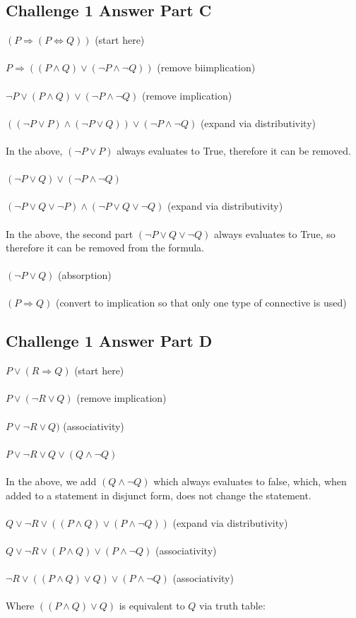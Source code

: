 \documentclass[12pt]{article}
\newcommand{\impl}{\mathbin{\Rightarrow}}
\newcommand{\biim}{\mathbin{\Leftrightarrow}}
\newcommand\tab[1][1cm]{\hspace*{#1}}
\begin{document}
\subsection*{Challenge 1 Answer Part C}
$(P \impl (P \biim Q))$ \tab (start here)\\\\
$P \impl ((P \land Q) \lor (\neg P \land \neg Q))$ \tab (remove biimplication)\\\\
$\neg P \lor (P \land Q) \lor (\neg P \land \neg Q)$ \tab (remove implication)\\\\
$((\neg P \lor P) \land (\neg P \lor Q)) \lor (\neg P \land \neg Q)$ \tab (expand via distributivity) \\\\
In the above, $(\neg P \lor P)$ always evaluates to True, therefore it can be removed. \\\\
$(\neg P \lor Q) \lor (\neg P \land \neg Q)$ \\\\
$(\neg P \lor Q \lor \neg P) \land (\neg P \lor Q \lor \neg Q)$ \tab (expand via distributivity) \\\\
In the above, the second part $(\neg P \lor Q \lor \neg Q)$ always evaluates to True, so therefore it can be removed from the formula.\\\\
$(\neg P \lor Q)$ \tab (absorption) \\\\
$(P \impl Q)$ \tab (convert to implication so that only one type of connective is used)

\subsection*{Challenge 1 Answer Part D}
$P \lor (R \impl Q)$ \tab (start here) \\\\
$P \lor (\neg R \lor Q)$ \tab (remove implication) \\\\
$P \lor \neg R \lor Q)$ \tab (associativity) \\\\
$P \lor \neg R \lor Q \lor (Q \land \neg Q)$ \\\\
In the above, we add $(Q \land \neg Q)$ which always evaluates to false, which, when added to a statement in disjunct form, does not change the statement.\\\\
$Q \lor \neg R \lor ((P \land Q) \lor (P \land \neg Q))$ \tab (expand via distributivity) \\\\
$Q \lor \neg R \lor (P \land Q) \lor (P \land \neg Q)$ \tab (associativity) \\\\
$\neg R \lor ((P \land Q) \lor Q) \lor (P \land \neg Q)$ \tab (associativity) \\\\
Where $((P \land Q) \lor Q)$ is equivalent to $Q$ via truth table:
\end{document}
